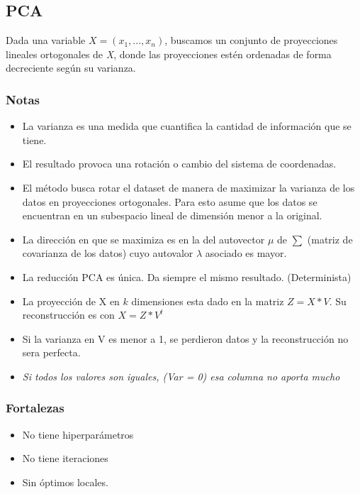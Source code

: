 \documentclass[titlepage,a4paper]{article}
\begin{document}
\subsection{PCA}

Dada una variable \begin{math} X = (x_1,...,x_n) \end{math}, buscamos un conjunto de proyecciones lineales ortogonales de \textit{X}, donde las proyecciones estén ordenadas de forma decreciente según su varianza.

\subsubsection*{Notas}
\begin{itemize}

\item La varianza es una medida que cuantifica la cantidad de información que se tiene.

\item El resultado provoca una rotación o cambio del sistema de coordenadas.

\item El método busca rotar el dataset de manera de maximizar la varianza de los datos en proyecciones ortogonales. Para esto asume que los datos se encuentran en un subespacio lineal de dimensión menor a la original.

\item La dirección en que se maximiza es en la del autovector $\mu$ de $\sum$ (matriz de covarianza de los datos) cuyo autovalor $\lambda$ asociado es mayor.

\item La reducción PCA es única. Da siempre el mismo resultado. (Determinista)

\item La proyección de X en $k$ dimensiones esta dado en la matriz $Z = X * V$. Su reconstrucción es con $X = Z * V^{t}$

\item Si la varianza en V es menor a 1, se perdieron datos y la reconstrucción no sera perfecta.

\item \textit{Si todos los valores son iguales, (Var = 0) esa columna no aporta mucho}

\end{itemize}

\subsubsection*{Fortalezas}
\begin{itemize}
    \item No tiene hiperparámetros
    \item No tiene iteraciones
    \item Sin óptimos locales.
\end{itemize}
\end{document}
